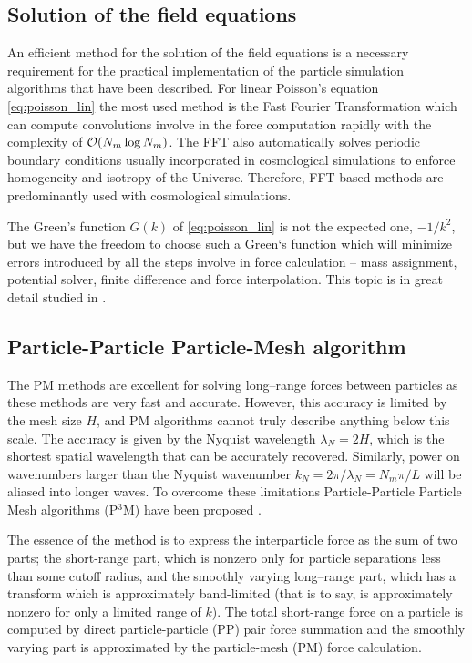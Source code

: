 \subsection{Solution of the field equations}
An efficient method for the solution of the field equations is a necessary requirement for the practical implementation of the particle simulation algorithms that have been described. For linear Poisson’s equation \eqref{eq:poisson_lin} the most used method is the Fast Fourier Transformation which can compute convolutions involve in the force computation rapidly with the complexity of $\mathcal{O}(N_m\log N_m)$. The FFT also automatically solves periodic boundary conditions usually incorporated in cosmological simulations to enforce homogeneity and isotropy of the Universe. Therefore, FFT-based methods are predominantly used with cosmological simulations.

The Green's function $G(k)$ of \eqref{eq:poisson_lin} is not the expected one, $-1/k^2$, but we have the freedom to choose such a Green`s function which will minimize errors introduced by all the steps involve in force calculation -- mass assignment, potential solver, finite difference and force interpolation. This topic is in great detail studied in \textcite{Hockney:1988:CSU:62815}.
\subsection{Particle-Particle Particle-Mesh algorithm}
The PM methods are excellent for solving long--range forces between particles as these methods are very fast and accurate. However, this accuracy is limited by the mesh size $H$, and PM algorithms cannot truly describe anything below this scale. The accuracy is given by the Nyquist wavelength $\lambda_N=2H$, which is the shortest spatial wavelength that can be accurately recovered. Similarly, power on wavenumbers larger than the Nyquist wavenumber $k_N=2\pi/\lambda_N=N_m\pi/L$ will be aliased into longer waves. To overcome these limitations Particle-Particle Particle Mesh algorithms (P$^3$M) have been proposed \textcite{hockney_10000_1973}.

The essence of the method is to express the interparticle force as the sum of two parts; the short-range part, which is nonzero only for particle separations less than some cutoff radius, and the smoothly varying long--range part, which has a transform which is approximately band-limited (that is to say, is approximately nonzero for only a limited range of $k$). The total short-range force on a particle is computed by direct particle-particle (PP) pair force summation and the smoothly varying part is approximated by the particle-mesh (PM) force calculation.

